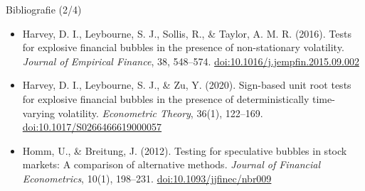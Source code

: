 \begin{frame}{Bibliografie (2/4)}
\begin{itemize}
    \item Harvey, D. I., Leybourne, S. J., Sollis, R., \& Taylor, A. M. R. (2016). Tests for explosive financial bubbles in the presence of non-stationary volatility. \textit{Journal of Empirical Finance}, 38, 548--574. \href{https://doi.org/10.1016/j.jempfin.2015.09.002}{doi:10.1016/j.jempfin.2015.09.002}
    \item Harvey, D. I., Leybourne, S. J., \& Zu, Y. (2020). Sign-based unit root tests for explosive financial bubbles in the presence of deterministically time-varying volatility. \textit{Econometric Theory}, 36(1), 122--169. \href{https://doi.org/10.1017/S0266466619000057}{doi:10.1017/S0266466619000057}
    \item Homm, U., \& Breitung, J. (2012). Testing for speculative bubbles in stock markets: A comparison of alternative methods. \textit{Journal of Financial Econometrics}, 10(1), 198--231. \href{https://doi.org/10.1093/jjfinec/nbr009}{doi:10.1093/jjfinec/nbr009}
\end{itemize}
\end{frame}

